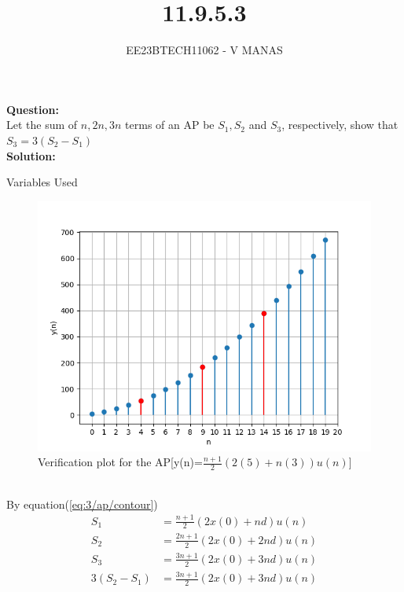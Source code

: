 \documentclass[journal,12pt,twocolumn]{IEEEtran}
\theoremstyle{remark}
\begin{document}

\vspace{3cm}

\title{11.9.5.3}
\author{EE23BTECH11062 - V MANAS}
\maketitle
\newpage

\bigskip
\textbf{Question:}\\Let the sum of $n,2n,3n$ terms of an AP be $S_1,S_2$ and $S_3$, respectively, show that $S_3=3(S_2-S_1)$\\
\textbf{Solution:}
\begin{table}[h]
    \centering
    
    \caption{Variables Used}
    \label{tab:table_11.9.5.3}
\end{table}
\begin{figure}[h]
    \centering
    \includegraphics[width=1.3\linewidth]{figs/graph.png}
    \caption{Verification plot for the AP[y(n)=$\frac{n+1}{2}(2(5)+n(3))u(n)$]}
\end{figure}\\
By equation(\ref{eq:3/ap/contour})
\begin{align}
    S_1&=\frac{n+1}{2}(2x(0)+nd)u(n)\\
    S_2&=\frac{2n+1}{2}(2x(0)+2nd)u(n)\\
    S_3&=\frac{3n+1}{2}(2x(0)+3nd)u(n)\\
    3(S_2-S_1)&=\frac{3n+1}{2}(2x(0)+3nd)u(n)
\end{align}
\end{document}
